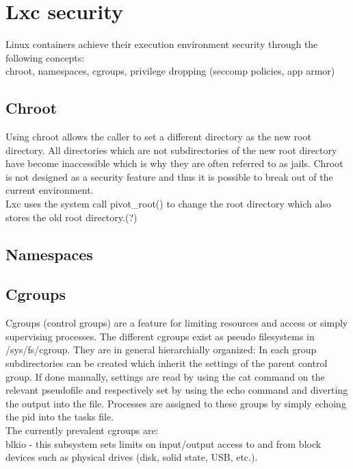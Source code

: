 \chapter{Lxc security}

Linux containers achieve their execution environment security through the following concepts:\\
chroot, namespaces, cgroups, privilege dropping (seccomp policies, app armor)\\

\section{Chroot}

Using chroot allows the caller to set a different directory as the new root directory. All directories which are not subdirectories
of the new root directory have become inaccessible which is why they are often referred to as jails. Chroot is not designed as a security
feature and thus it is possible to break out of the current environment.\\
Lxc uses the system call pivot\_root() to change the root directory which also stores the old root directory.(?)

\section{Namespaces}

\section{Cgroups}

Cgroups (control groups) are a feature for limiting resources and access or simply supervising processes. The different cgroups exist as
pseudo filesystems in /sys/fs/cgroup. They are in general hierarchially organized: In each group subdirectories can be created
which inherit the settings of the parent control group. If done manually, settings are read by using the cat command on the relevant
pseudofile and respectively set by using the echo command and diverting the output into the file. Processes are assigned to these groups
by simply echoing the pid into the tasks file.\\
The currently prevalent cgroups are:\\
blkio - this subsystem sets limits on input/output access to and from block devices such as physical drives (disk, solid state, USB, etc.). 

